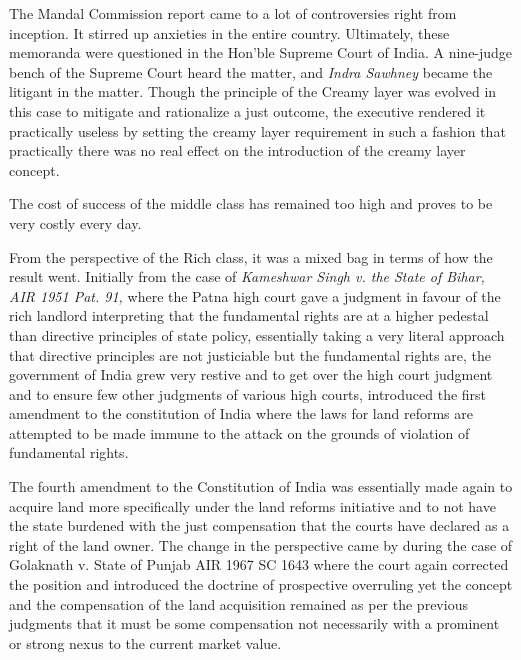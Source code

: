 \begin{multicols}{2}
\noi
The Mandal Commission report came to a lot of controversies right from inception. It stirred up anxieties in the entire country. Ultimately, these memoranda were questioned in the Hon’ble Supreme Court of India. A nine-judge bench of the Supreme Court heard the matter, and \textit{Indra Sawhney} became the litigant in the matter. Though the principle of the Creamy layer was evolved in this case to mitigate and rationalize a just outcome, the executive rendered it practically useless by setting the creamy layer requirement in such a fashion that practically there was no real effect on the introduction of the creamy layer concept.

\noi
The cost of success of the middle class has remained too high and proves to be very costly every day.


\noi
From the perspective of the Rich class, it was a mixed bag in terms of how the result went. Initially from the case of \textit{Kameshwar Singh v. the State of Bihar, AIR 1951 Pat. 91,} where the Patna high court gave a judgment in favour of the rich landlord interpreting that the fundamental rights are at a higher pedestal than directive principles of state policy, essentially taking a very literal approach that directive principles are not justiciable but the fundamental rights are, the government of India grew very restive and to get over the high court judgment and to ensure few other judgments of various high courts, introduced the first amendment to the constitution of India where the laws for land reforms are attempted to be made immune to the attack on the grounds of violation of fundamental rights.

\noi
The fourth amendment to the Constitution of India was essentially made again to acquire land more specifically under the land reforms initiative and to not have the state burdened with the just compensation that the courts have declared as a right of the land owner. The change in the perspective came by during the case of Golaknath v. State of Punjab AIR 1967 SC 1643 where the court again corrected the position and introduced the doctrine of prospective overruling yet the concept and the compensation of the land acquisition remained as per the previous judgments that it must be some compensation not necessarily with a prominent or strong nexus to the current market value.


\end{multicols}
